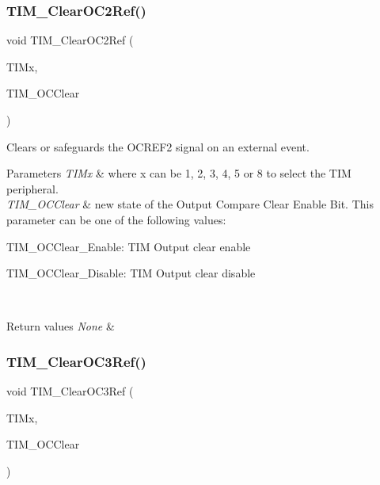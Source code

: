 \subsubsection{\texorpdfstring{TIM\_ClearOC2Ref()}{TIM\_ClearOC2Ref()}}
{\footnotesize\ttfamily void T\+I\+M\+\_\+\+Clear\+O\+C2\+Ref (\begin{DoxyParamCaption}\item[{\mbox{\hyperlink{struct_t_i_m___type_def}{T\+I\+M\+\_\+\+Type\+Def}} $\ast$}]{T\+I\+Mx,  }\item[{uint16\+\_\+t}]{T\+I\+M\+\_\+\+O\+C\+Clear }\end{DoxyParamCaption})}



Clears or safeguards the O\+C\+R\+E\+F2 signal on an external event. 


\begin{DoxyParams}{Parameters}
{\em T\+I\+Mx} & where x can be 1, 2, 3, 4, 5 or 8 to select the T\+IM peripheral. \\
\hline
{\em T\+I\+M\+\_\+\+O\+C\+Clear} & new state of the Output Compare Clear Enable Bit. This parameter can be one of the following values\+: \begin{DoxyItemize}
\item T\+I\+M\+\_\+\+O\+C\+Clear\+\_\+\+Enable\+: T\+IM Output clear enable \item T\+I\+M\+\_\+\+O\+C\+Clear\+\_\+\+Disable\+: T\+IM Output clear disable \end{DoxyItemize}
\\
\hline
\end{DoxyParams}

\begin{DoxyRetVals}{Return values}
{\em None} & \\
\hline
\end{DoxyRetVals}
\mbox{\label{group___t_i_m___exported___functions_ga0bd9476a14bd346c319945ec4fa2bc67}} 
\subsubsection{\texorpdfstring{TIM\_ClearOC3Ref()}{TIM\_ClearOC3Ref()}}
{\footnotesize\ttfamily void T\+I\+M\+\_\+\+Clear\+O\+C3\+Ref (\begin{DoxyParamCaption}\item[{\mbox{\hyperlink{struct_t_i_m___type_def}{T\+I\+M\+\_\+\+Type\+Def}} $\ast$}]{T\+I\+Mx,  }\item[{uint16\+\_\+t}]{T\+I\+M\+\_\+\+O\+C\+Clear }\end{DoxyParamCaption})}



